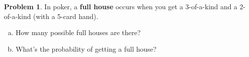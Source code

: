\documentclass[10pt]{amsart}
\theoremstyle{definition}
\newcommand{\dicegamesanswerbox}[1][\phantom{E}]{\begin{flushright}\framebox[2cm]{\begin{minipage}{.3in}\vspace{.07in}\begin{flushright}\hfill#1\hfill\end{flushright} \vfill \vspace{.16in}\end{minipage}\hfill}\end{flushright}}
\newtheorem{problem}{Problem} %
\def\P{\mathbb{P}} %
\begin{document}
\newpage
\begin{problem}
  In poker, a \textbf{full house} occurs when you get a 3-of-a-kind and a 2-of-a-kind (with a 5-card hand).

  \begin{enumerate}[(a)]
    \item How many possible full houses are there?
    \vspace{2.75cm} %
    \item What's the probability of getting a full house?
    \vspace{2.75cm} %
  \end{enumerate}


\end{problem}
\end{document}
